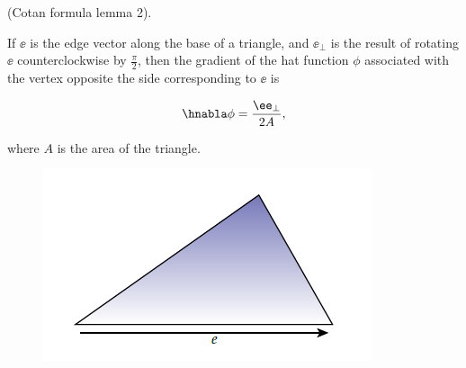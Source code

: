 \begin{lemma}
\label{ch::ddg:lemma::cotan_edge_perp}
    (Cotan formula lemma 2).
    
    If $\ee$ is the edge vector along the base of a triangle, and $\ee_\perp$ is the result of rotating $\ee$ counterclockwise by $\frac{\pi}{2}$, then the gradient of the hat function $\phi$ associated with the vertex opposite the side corresponding to $\ee$ is
    
    \begin{align*}
        \hnabla \phi  = \frac{\ee_\perp}{2A},
    \end{align*}
    
    where $A$ is the area of the triangle.
    
    \begin{figure}[H]
        \centering
        \includegraphics{images/fem_cotan_lemma2.PNG}
        \caption{\cite[p. 106]{book::DDG}}
    \end{figure}
\end{lemma}

